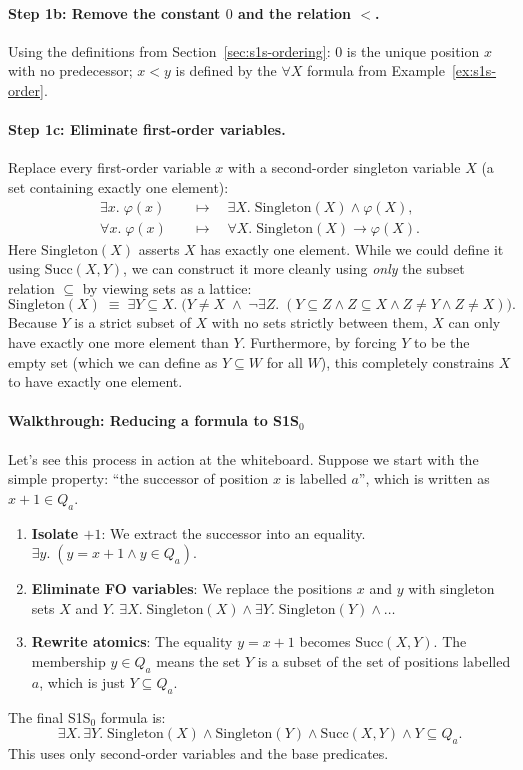 \paragraph{Step 1b: Remove the constant $0$ and the relation $<$.}
Using the definitions from Section~\ref{sec:s1s-ordering}:
$0$ is the unique position $x$ with no predecessor; $x < y$ is defined
by the $\forall X$ formula from Example~\ref{ex:s1s-order}.

\paragraph{Step 1c: Eliminate first-order variables.}
Replace every first-order variable $x$ with a second-order singleton
variable $X$ (a set containing exactly one element):
\begin{align*}
  \exists x.\;\varphi(x) &\quad\mapsto\quad \exists X.\;\mathrm{Singleton}(X) \land \varphi(X), \\
  \forall x.\;\varphi(x) &\quad\mapsto\quad \forall X.\;\mathrm{Singleton}(X) \to \varphi(X).
\end{align*}
Here $\mathrm{Singleton}(X)$ asserts $X$ has exactly one element. While we could define it using $\mathrm{Succ}(X,Y)$, we can construct it more cleanly using \emph{only} the subset relation $\subseteq$ by viewing sets as a lattice:
\[
  \mathrm{Singleton}(X) \;\equiv\;
  \exists Y \subseteq X.\; \bigl(Y \neq X \;\land\; \neg\exists Z.\; (Y \subseteq Z \land Z \subseteq X \land Z \neq Y \land Z \neq X)\bigr).
\]
Because $Y$ is a strict subset of $X$ with no sets strictly between them, $X$ can only have exactly one more element than $Y$. Furthermore, by forcing $Y$ to be the empty set (which we can define as $Y \subseteq W$ for all $W$), this completely constrains $X$ to have exactly one element.

\paragraph{Walkthrough: Reducing a formula to S1S$_0$}
Let's see this process in action at the whiteboard. Suppose we start with the simple property: ``the successor of position $x$ is labelled $a$'', which is written as $x+1 \in Q_a$.
\begin{enumerate}
    \item \textbf{Isolate $+1$}: We extract the successor into an equality.
          $\exists y.\; (y = x+1 \land y \in Q_a)$.
    \item \textbf{Eliminate FO variables}: We replace the positions $x$ and $y$ with singleton sets $X$ and $Y$.
          $\exists X.\; \mathrm{Singleton}(X) \land \exists Y.\; \mathrm{Singleton}(Y) \land \dots$
    \item \textbf{Rewrite atomics}: The equality $y = x+1$ becomes $\mathrm{Succ}(X, Y)$. The membership $y \in Q_a$ means the set $Y$ is a subset of the set of positions labelled $a$, which is just $Y \subseteq Q_a$.
\end{enumerate}
The final S1S$_0$ formula is:
\[
  \exists X.\, \exists Y.\; \mathrm{Singleton}(X) \land \mathrm{Singleton}(Y) \land \mathrm{Succ}(X, Y) \land Y \subseteq Q_a.
\]
This uses only second-order variables and the base predicates.

